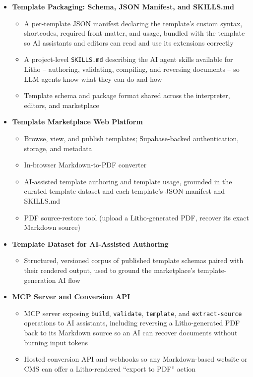\documentclass[a4paper,twoside]{article}
\begin{document}
\begin{itemize}[leftmargin=*]
  \item \textbf{Template Packaging: Schema, JSON Manifest, and SKILLS.md}
    \begin{itemize}
      \item A per-template JSON manifest declaring the template's custom syntax, shortcodes, required front matter, and usage, bundled with the template so AI assistants and editors can read and use its extensions correctly
      \item A project-level \texttt{SKILLS.md} describing the AI agent skills available for Litho -- authoring, validating, compiling, and reversing documents -- so LLM agents know what they can do and how
      \item Template schema and package format shared across the interpreter, editors, and marketplace
    \end{itemize}

  \item \textbf{Template Marketplace Web Platform}
    \begin{itemize}
      \item Browse, view, and publish templates; Supabase-backed authentication, storage, and metadata
      \item In-browser Markdown-to-PDF converter
      \item AI-assisted template authoring and template usage, grounded in the curated template dataset and each template's JSON manifest and SKILLS.md
      \item PDF source-restore tool (upload a Litho-generated PDF, recover its exact Markdown source)
    \end{itemize}

  \item \textbf{Template Dataset for AI-Assisted Authoring}
    \begin{itemize}
      \item Structured, versioned corpus of published template schemas paired with their rendered output, used to ground the marketplace's template-generation AI flow
    \end{itemize}

  \item \textbf{MCP Server and Conversion API}
    \begin{itemize}
      \item MCP server exposing \texttt{build}, \texttt{validate}, \texttt{template}, and \texttt{extract-source} operations to AI assistants, including reversing a Litho-generated PDF back to its Markdown source so an AI can recover documents without burning input tokens
      \item Hosted conversion API and webhooks so any Markdown-based website or CMS can offer a Litho-rendered ``export to PDF'' action
    \end{itemize}


\end{itemize}
\end{document}
